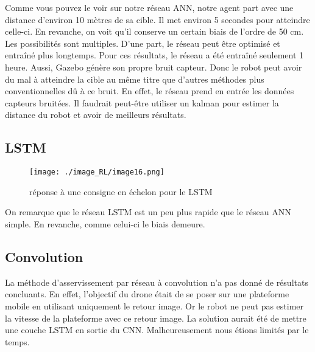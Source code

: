 Comme vous pouvez le voir sur notre réseau ANN, notre agent part avec une distance d’environ 10 mètres de sa cible. 
Il met environ 5 secondes pour atteindre celle-ci. En revanche, on voit qu’il conserve un certain biais de l’ordre de 50 cm. Les possibilités sont multiples.
D’une part, le réseau peut être optimisé et entraîné plus longtemps. Pour ces résultats, le réseau a été entraîné seulement 1 heure.
Aussi, Gazebo génère son propre bruit capteur. Donc le robot peut avoir du mal à atteindre la cible au même titre que d’autres méthodes plus conventionnelles dû à ce bruit.
En effet, le réseau prend en entrée les données capteurs bruitées.
Il faudrait peut-être utiliser un kalman pour estimer la distance du robot et avoir de meilleurs résultats.

\subsection{LSTM}

\begin{figure}[H]
    \centering
    \texttt{[image: ./image\_RL/image16.png]}
    \caption{ réponse à une consigne en échelon pour le LSTM    }
\end{figure}

On remarque que le réseau LSTM est un peu plus rapide que le réseau ANN simple. En revanche, comme celui-ci le biais demeure.

\subsection{Convolution}
La méthode d’asservissement par réseau à convolution n’a pas donné de résultats concluants. En effet, l’objectif du drone était de se poser sur une plateforme mobile en utilisant uniquement le retour image.
Or le robot ne peut pas estimer la vitesse de la plateforme avec ce retour image.
La solution aurait été de mettre une couche LSTM en sortie du CNN.
Malheureusement nous étions limités par le temps.

